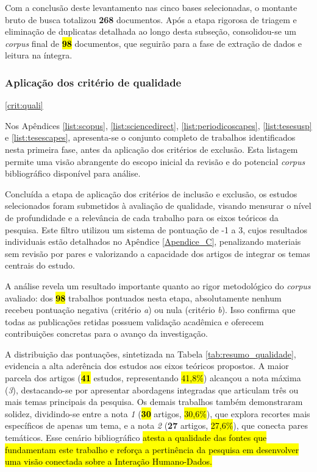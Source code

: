 \documentclass[
	12pt,				%
	oneside,			%
	a4paper,			%
	english,			%
	brazil				%
	]{abntex2ppgsi}
\begin{document}
    Com a conclusão deste levantamento nas cinco bases selecionadas, o montante bruto de busca totalizou \textbf{268} documentos. Após a etapa rigorosa de triagem e eliminação de duplicatas detalhada ao longo desta subseção, consolidou-se um \textit{corpus} final de \hl{\textbf{98}} documentos, que seguirão para a fase de extração de dados e leitura na íntegra.


     \subsubsection{Aplicação dos critério de qualidade}\ref{crit:quali}
     
    Nos Apêndices \ref{list:scopus}, \ref{list:sciencedirect}, \ref{list:periodicoscapes}, \ref{list:tesesusp} e \ref{list:tesescapes}, apresenta-se o conjunto completo de trabalhos identificados nesta primeira fase, antes da aplicação dos critérios de exclusão. Esta listagem permite uma visão abrangente do escopo inicial da revisão e do potencial \textit{corpus} bibliográfico disponível para análise.

    Concluída a etapa de aplicação dos critérios de inclusão e exclusão, os estudos selecionados foram submetidos à avaliação de qualidade, visando mensurar o nível de profundidade e a relevância de cada trabalho para os eixos teóricos da pesquisa. Este filtro utilizou um sistema de pontuação de -1 a 3, cujos resultados individuais estão detalhados no Apêndice \ref{Apendice_C}, penalizando materiais sem revisão por pares e valorizando a capacidade dos artigos de integrar os temas centrais do estudo.

    A análise revela um resultado importante quanto ao rigor metodológico do \textit{corpus} avaliado: dos \hl{\textbf{98}} trabalhos pontuados nesta etapa, absolutamente nenhum recebeu pontuação negativa (critério \textit{a}) ou nula (critério \textit{b}). Isso confirma que todas as publicações retidas possuem validação acadêmica e oferecem contribuições concretas para o avanço da investigação.

    A distribuição das pontuações, sintetizada na Tabela \ref{tab:resumo_qualidade}, evidencia a alta aderência dos estudos aos eixos teóricos propostos. A maior parcela dos artigos (\hl{\textbf{41}} estudos, representando \hl{41,8\%}) alcançou a nota máxima (\emph{3}), destacando-se por apresentar abordagens integradas que articulam três ou mais temas principais da pesquisa. Os demais trabalhos também demonstraram solidez, dividindo-se entre a nota \emph{1} (\hl{\textbf{30}} artigos, \hl{30,6\%}), que explora recortes mais específicos de apenas um tema, e a nota \emph{2} (\textbf{27} artigos, \hl{27,6\%}), que conecta pares temáticos. Esse cenário bibliográfico \hl{atesta a qualidade das fontes que fundamentam este trabalho e reforça a pertinência da pesquisa em desenvolver uma visão conectada sobre a Interação Humano-Dados.}
\end{document}
